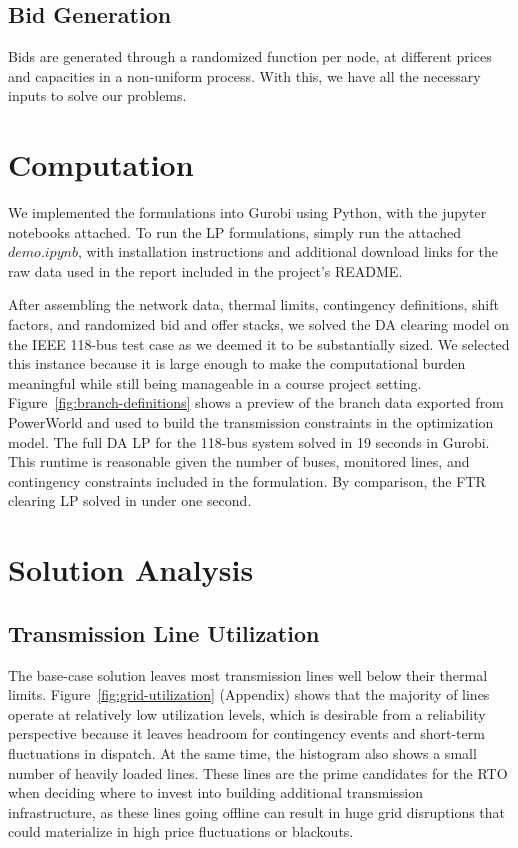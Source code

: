 \documentclass[11pt]{article}
\begin{document}
\subsection{Bid Generation}

Bids are generated through a randomized function per node, at different prices and capacities in a non-uniform process. With this, we have all the necessary inputs to solve our problems.

\section{Computation}
We implemented the formulations into Gurobi using Python, with the jupyter notebooks attached. To run the LP formulations, simply run the attached $\textit{demo.ipynb}$, with installation instructions and additional download links for the raw data used in the report included in the project's README.

After assembling the network data, thermal limits, contingency definitions, shift factors, and randomized bid and offer stacks, we solved the DA clearing model on the IEEE 118-bus test case as we deemed it to be substantially sized. We selected this instance because it is large enough to make the computational burden meaningful while still being manageable in a course project setting. Figure~\ref{fig:branch-definitions} shows a preview of the branch data exported from PowerWorld and used to build the transmission constraints in the optimization model. The full DA LP for the 118-bus system solved in 19 seconds in Gurobi. This runtime is reasonable given the number of buses, monitored lines, and contingency constraints included in the formulation. By comparison, the FTR clearing LP solved in under one second.

\newpage
\section{Solution Analysis}


\subsection{Transmission Line Utilization}

The base-case solution leaves most transmission lines well below their thermal limits. Figure~\ref{fig:grid-utilization} (Appendix) shows that the majority of lines operate at relatively low utilization levels, which is desirable from a reliability perspective because it leaves headroom for contingency events and short-term fluctuations in dispatch. At the same time, the histogram also shows a small number of heavily loaded lines. These lines are the prime candidates for the RTO when deciding where to invest into building additional transmission infrastructure, as these lines going offline can result in huge grid disruptions that could materialize in high price fluctuations or blackouts.
\end{document}
